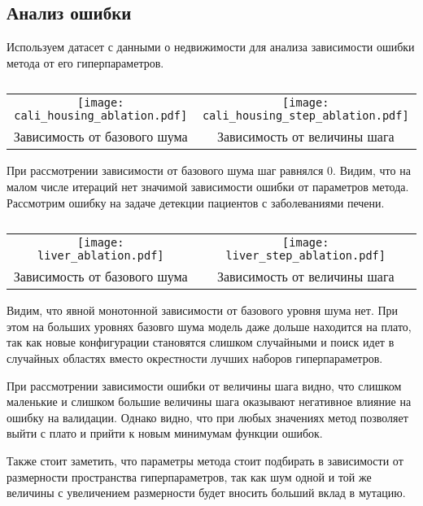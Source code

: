 \documentclass{article}
\begin{document}
\newpage

\subsection{Анализ ошибки}
 
Используем датасет с данными о недвижимости для анализа зависимости ошибки метода от его гиперпараметров.
\begin{table}[h]
    \centering
    \begin{tabular}{cc}
        \texttt{[image: cali\_housing\_ablation.pdf]}
        &
        \texttt{[image: cali\_housing\_step\_ablation.pdf]} \\
        Зависимость от базового шума & Зависимость от величины шага
    \end{tabular}
    \label{table:datasets2}
    \caption{}
\end{table}
\par
При рассмотрении зависимости от базового шума шаг равнялся 0. Видим, что на малом числе итераций нет значимой зависимости ошибки от параметров метода. Рассмотрим ошибку на задаче детекции пациентов с заболеваниями печени.

\newpage

\begin{table}[h]
    \centering
    \begin{tabular}{cc}
        \texttt{[image: liver\_ablation.pdf]}
        &
        \texttt{[image: liver\_step\_ablation.pdf]} \\
        Зависимость от базового шума & Зависимость от величины шага
    \end{tabular}
    \label{table:datasets2}
    \caption{}
\end{table}
\par
Видим, что явной монотонной зависимости от базового уровня шума нет. При этом на больших уровнях базовго шума модель даже дольше находится на плато, так как новые конфигурации становятся слишком случайными и поиск идет в случайных областях вместо окрестности лучших наборов гиперпараметров.

При рассмотрении зависимости ошибки от величины шага видно, что слишком маленькие и слишком большие величины шага оказывают негативное влияние на ошибку на валидации. Однако видно, что при любых значениях метод позволяет выйти с плато и прийти к новым минимумам функции ошибок.

Также стоит заметить, что параметры метода стоит подбирать в зависимости от размерности пространства гиперпараметров, так как шум одной и той же величины с увеличением размерности будет вносить больший вклад в мутацию.
\end{document}
